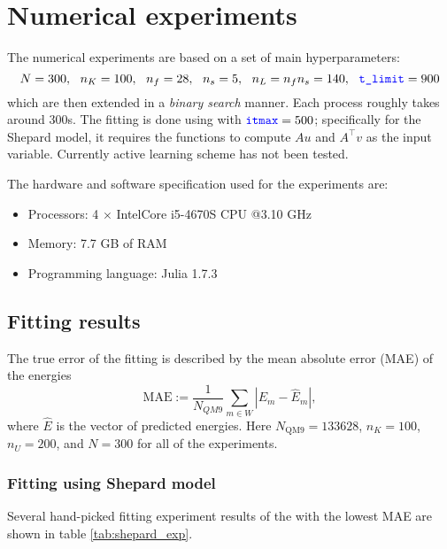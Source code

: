 \documentclass[12pt]{article}
\begin{document}
\section{Numerical experiments}
The numerical experiments are based on a set of main hyperparameters:
\begin{equation}
	N = 300,~~ n_K = 100, ~~ n_f = 28, ~~ n_s = 5, ~~ n_L = n_fn_s = 140, ~~ \codeword{t_limit} = 900
\end{equation}
which are then extended in a \textit{binary search} manner. Each  process roughly takes around 300s. 
The fitting is done using  with $\codeword{itmax} = 500$; specifically for the Shepard model, it requires the functions to compute $Au$ and $A^\top v$ as the input variable. 
Currently active learning scheme has not been tested.

The hardware and software specification used for the experiments are:
\begin{itemize}
	\item Processors: 4 $\times$ Intel\textregistered Core i5-4670S CPU @3.10 GHz
	\item Memory: 7.7 GB of RAM
	\item Programming language: Julia 1.7.3
\end{itemize}

\subsection{Fitting results}
\label{subsec:fitting}
The true error of the fitting is described by the mean absolute error (MAE) of the energies
\begin{equation}
	\text{MAE} := \frac{1}{N_{QM9}}\sum_{m \in W}|E_{m} - \hat{E}_m|,
\end{equation}
where $\hat{E}$ is the vector of predicted energies. Here $N_\text{QM9} = 133628$, $n_K = 100$, $n_U = 200$, and $N = 300$ for all of the experiments. 

\subsubsection{Fitting using Shepard model}
\label{subsubsec:shepard}
Several hand-picked fitting experiment results of the with the lowest MAE are shown in table \ref{tab:shepard_exp}.
\end{document}

